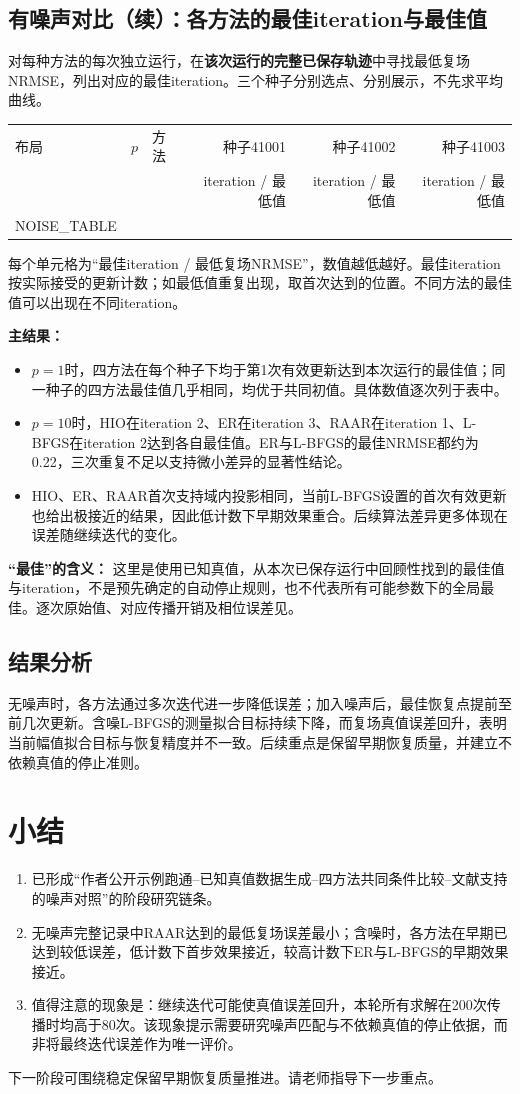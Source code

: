 \documentclass[UTF8,a4paper,11pt,fontset=fandol]{ctexart}
\begin{document}
\subsection*{有噪声对比（续）：各方法的最佳iteration与最佳值}
对每种方法的每次独立运行，在\textbf{该次运行的完整已保存轨迹}中寻找最低复场NRMSE，列出对应的最佳iteration。三个种子分别选点、分别展示，不先求平均曲线。
\begin{center}\small\begin{tabular}{ll l rrr}\toprule
布局 & $p$ & 方法 & 种子41001 & 种子41002 & 种子41003\\
 & & & iteration / 最低值 & iteration / 最低值 & iteration / 最低值\\\midrule
NOISE_TABLE
\bottomrule\end{tabular}\end{center}
每个单元格为“最佳iteration / 最低复场NRMSE”，数值越低越好。最佳iteration按实际接受的更新计数；如最低值重复出现，取首次达到的位置。不同方法的最佳值可以出现在不同iteration。
\par\textbf{主结果：}
\begin{itemize}
\item $p=1$时，四方法在每个种子下均于第1次有效更新达到本次运行的最佳值；同一种子的四方法最佳值几乎相同，均优于共同初值。具体数值逐次列于表中。
\item $p=10$时，HIO在iteration 2、ER在iteration 3、RAAR在iteration 1、L-BFGS在iteration 2达到各自最佳值。ER与L-BFGS的最佳NRMSE都约为0.22，三次重复不足以支持微小差异的显著性结论。
\item HIO、ER、RAAR首次支持域内投影相同，当前L-BFGS设置的首次有效更新也给出极接近的结果，因此低计数下早期效果重合。后续算法差异更多体现在误差随继续迭代的变化。
\end{itemize}
\textbf{“最佳”的含义：} 这里是使用已知真值，从本次已保存运行中回顾性找到的最佳值与iteration，不是预先确定的自动停止规则，也不代表所有可能参数下的全局最佳。逐次原始值、对应传播开销及相位误差见。
\subsection*{结果分析}
无噪声时，各方法通过多次迭代进一步降低误差；加入噪声后，最佳恢复点提前至前几次更新。含噪L-BFGS的测量拟合目标持续下降，而复场真值误差回升，表明当前幅值拟合目标与恢复精度并不一致。后续重点是保留早期恢复质量，并建立不依赖真值的停止准则。

\clearpage
\section{小结}
\begin{enumerate}
\item 已形成“作者公开示例跑通--已知真值数据生成--四方法共同条件比较--文献支持的噪声对照”的阶段研究链条。
\item 无噪声完整记录中RAAR达到的最低复场误差最小；含噪时，各方法在早期已达到较低误差，低计数下首步效果接近，较高计数下ER与L-BFGS的早期效果接近。
\item 值得注意的现象是：继续迭代可能使真值误差回升，本轮所有求解在200次传播时均高于80次。该现象提示需要研究噪声匹配与不依赖真值的停止依据，而非将最终迭代误差作为唯一评价。
\end{enumerate}
下一阶段可围绕稳定保留早期恢复质量推进。请老师指导下一步重点。
\end{document}
